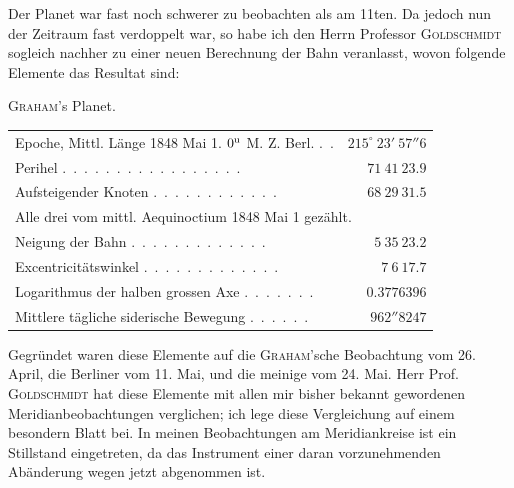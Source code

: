 Der Planet war fast noch schwerer zu beobachten als am 11ten. Da jedoch nun der Zeitraum fast verdoppelt war, so habe ich den Herrn Professor \textsc{Goldschmidt} sogleich nachher zu einer neuen Berechnung der Bahn veranlasst, wovon folgende Elemente das Resultat sind:

\begin{center}
\textsc{Graham}'s Planet.\\[3pt]
\small
\setlength{\tabcolsep}{3pt}
\begin{tabular}{lr}
Epoche, Mittl. Länge 1848 Mai 1. $0^{\rm u}$ M. Z. Berl. \mbox{.\ .} & $215^\circ\ 23'\ 57''6$ \\
Perihel \mbox{.\ .\ .\ .\ .\ .\ .\ .\ .\ .\ .\ .\ .\ .\ .\ .\ .} & $71\ 41\ 23.9$ \\
Aufsteigender Knoten \mbox{.\ .\ .\ .\ .\ .\ .\ .\ .\ .\ .\ .} & $68\ 29\ 31.5$ \\
\multicolumn{2}{l}{\quad Alle drei vom mittl. Aequinoctium 1848 Mai 1 gezählt.} \\
Neigung der Bahn \mbox{.\ .\ .\ .\ .\ .\ .\ .\ .\ .\ .\ .\ .} & $5\ 35\ 23.2$ \\
Excentricitätswinkel \mbox{.\ .\ .\ .\ .\ .\ .\ .\ .\ .\ .\ .\ .} & $7\ 6\ 17.7$ \\
Logarithmus der halben grossen Axe \mbox{.\ .\ .\ .\ .\ .\ .} & $0.3776396$ \\
Mittlere tägliche siderische Bewegung \mbox{.\ .\ .\ .\ .\ .} & $962''8247$ \\
\end{tabular}
\end{center}

Gegründet waren diese Elemente auf die \textsc{Graham}'sche Beobachtung vom 26. April, die Berliner vom 11. Mai, und die meinige vom 24. Mai. Herr Prof. \textsc{Goldschmidt} hat diese Elemente mit allen mir bisher bekannt gewordenen Meridianbeobachtungen verglichen; ich lege diese Vergleichung auf einem besondern Blatt bei. In meinen Beobachtungen am Meridiankreise ist ein Stillstand eingetreten, da das Instrument einer daran vorzunehmenden Abänderung wegen jetzt abgenommen ist.
